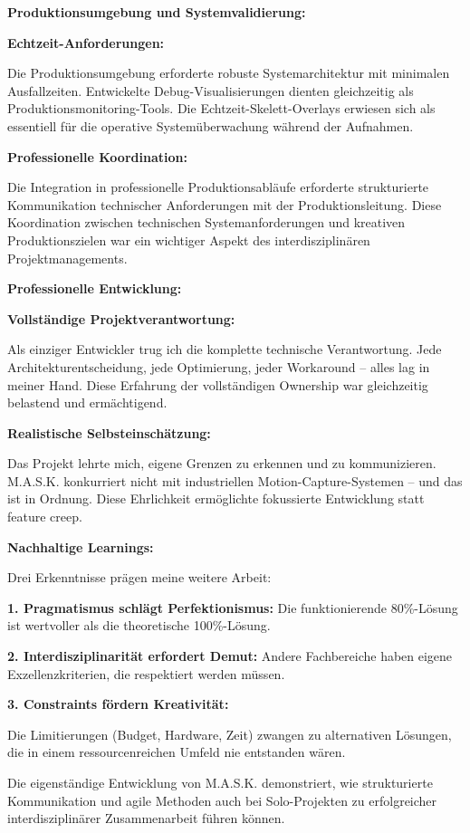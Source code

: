 \textbf{Produktionsumgebung und Systemvalidierung:}

\textbf{Echtzeit-Anforderungen:}

\raggedright Die Produktionsumgebung erforderte robuste Systemarchitektur mit minimalen Ausfallzeiten. Entwickelte Debug-Visualisierungen dienten gleichzeitig als Produktionsmonitoring-Tools. Die Echtzeit-Skelett-Overlays erwiesen sich als essentiell für die operative Systemüberwachung während der Aufnahmen.

\textbf{Professionelle Koordination:}

\raggedright Die Integration in professionelle Produktionsabläufe erforderte strukturierte Kommunikation technischer Anforderungen mit der Produktionsleitung. Diese Koordination zwischen technischen Systemanforderungen und kreativen Produktionszielen war ein wichtiger Aspekt des interdisziplinären Projektmanagements.

\textbf{Professionelle Entwicklung:}

\textbf{Vollständige Projektverantwortung:}

\raggedright Als einziger Entwickler trug ich die komplette technische Verantwortung. Jede Architekturentscheidung, jede Optimierung, jeder Workaround – alles lag in meiner Hand. Diese Erfahrung der vollständigen Ownership war gleichzeitig belastend und ermächtigend.

\textbf{Realistische Selbsteinschätzung:}

\raggedright Das Projekt lehrte mich, eigene Grenzen zu erkennen und zu kommunizieren. M.A.S.K. konkurriert nicht mit industriellen Motion-Capture-Systemen – und das ist in Ordnung. Diese Ehrlichkeit ermöglichte fokussierte Entwicklung statt feature creep.

\textbf{Nachhaltige Learnings:}

Drei Erkenntnisse prägen meine weitere Arbeit:

\textbf{1. Pragmatismus schlägt Perfektionismus:} Die funktionierende 80\%-Lösung ist wertvoller als die theoretische 100\%-Lösung.

\textbf{2. Interdisziplinarität erfordert Demut:} Andere Fachbereiche haben eigene Exzellenzkriterien, die respektiert werden müssen.

\textbf{3. Constraints fördern Kreativität:} \raggedright Die Limitierungen (Budget, Hardware, Zeit) zwangen zu alternativen Lösungen, die in einem ressourcenreichen Umfeld nie entstanden wären.

Die eigenständige Entwicklung von M.A.S.K. demonstriert, wie strukturierte Kommunikation und agile Methoden auch bei Solo-Projekten zu erfolgreicher interdisziplinärer Zusammenarbeit führen können.
